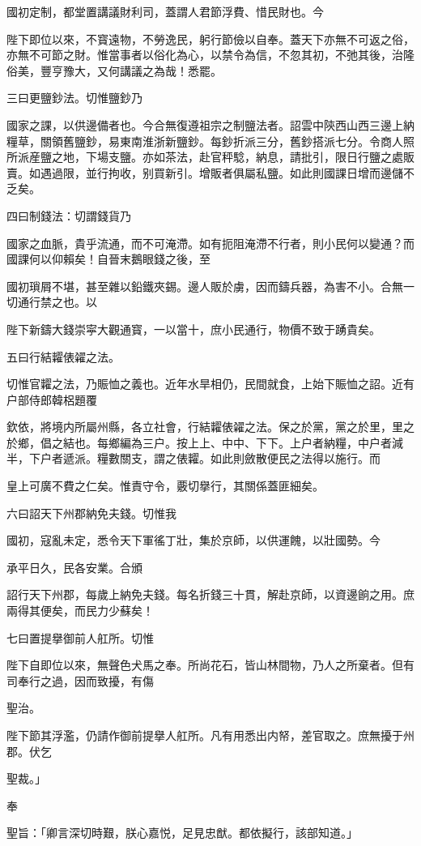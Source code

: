 國初定制，都堂置講議財利司，蓋謂人君節浮費、惜民財也。今

陛下即位以來，不寳遠物，不勞逸民，躬行節儉以自奉。蓋天下亦無不可返之俗，亦無不可節之財。惟當事者以俗化為心，以禁令為信，不忽其初，不弛其後，治隆俗美，豐亨豫大，又何講議之為哉！悉罷。

三曰更鹽鈔法。切惟鹽鈔乃

國家之課，以供邊備者也。今合無復遵祖宗之制鹽法者。詔雲中陝西山西三邊上納糧草，關領舊鹽鈔，易東南淮浙新鹽鈔。每鈔折派三分，舊鈔搭派七分。令商人照所派産鹽之地，下場支鹽。亦如茶法，赴官秤騐，納息，請批引，限日行鹽之處販賣。如遇過限，並行拘收，别買新引。增販者俱屬私鹽。如此則國課日增而邊儲不乏矣。

四曰制錢法：切謂錢貨乃

國家之血脈，貴乎流通，而不可淹滯。如有扼阻淹滯不行者，則小民何以變通？而國課何以仰賴矣！自晉末鵝眼錢之後，至

國初瑣屑不堪，甚至雜以鉛鐵夾錫。邊人販於虜，因而鑄兵器，為害不小。合無一切通行禁之也。以

陛下新鑄大錢崇寜大觀通寳，一以當十，庶小民通行，物價不致于踴貴矣。

五曰行結糶俵糴之法。

切惟官糶之法，乃賑恤之義也。近年水旱相仍，民間就食，上始下賑恤之詔。近有户部侍郎韓梠題覆

欽依，將境内所屬州縣，各立社會，行結糶俵糴之法。保之於黨，黨之於里，里之於鄉，倡之結也。每鄉編為三户。按上上、中中、下下。上户者納糧，中户者減半，下户者遞派。糧數關支，謂之俵糶。如此則斂散便民之法得以施行。而

皇上可廣不費之仁矣。惟責守令，覈切擧行，其關係蓋匪細矣。

六曰詔天下州郡納免夫錢。切惟我

國初，寇亂未定，悉令天下軍徭丁壯，集於京師，以供運餽，以壯國勢。今

承平日久，民各安業。合頒

詔行天下州郡，每歲上納免夫錢。每名折錢三十貫，解赴京師，以資邊餉之用。庶兩得其便矣，而民力少蘇矣！

七曰置提擧御前人舡所。切惟

陛下自即位以來，無聲色犬馬之奉。所尚花石，皆山林間物，乃人之所棄者。但有司奉行之過，因而致擾，有傷

聖治。

陛下節其浮濫，仍請作御前提擧人舡所。凡有用悉出内帑，差官取之。庶無擾于州郡。伏乞

聖裁。」

奉

聖旨：「卿言深切時艱，朕心嘉悦，足見忠猷。都依擬行，該部知道。」

